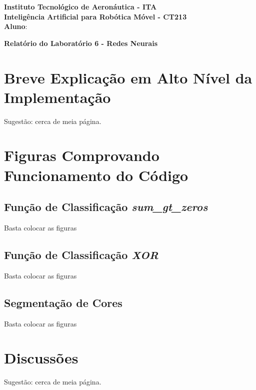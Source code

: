 \documentclass[brazil, 12pt]{article}
\begin{document}
\begin{center}
\textbf{Instituto Tecnológico de Aeronáutica - ITA} \\
\textbf{Inteligência Artificial para Robótica Móvel - CT213} \\
\textbf{Aluno}:     %
\end{center}

\begin{center}
\textbf{Relatório do Laboratório 6 - Redes Neurais}
\end{center}
\vspace*{0.5cm}

\section{Breve Explicação em Alto Nível da Implementação}
Sugestão: cerca de meia página.


\section{Figuras Comprovando Funcionamento do Código}

\subsection{Função de Classificação \emph{sum\_gt\_zeros}}
Basta colocar as figuras

\subsection{Função de Classificação \emph{XOR}}
Basta colocar as figuras

\subsection{Segmentação de Cores}
Basta colocar as figuras


\section{Discussões}
Sugestão: cerca de meia página.
\end{document}
